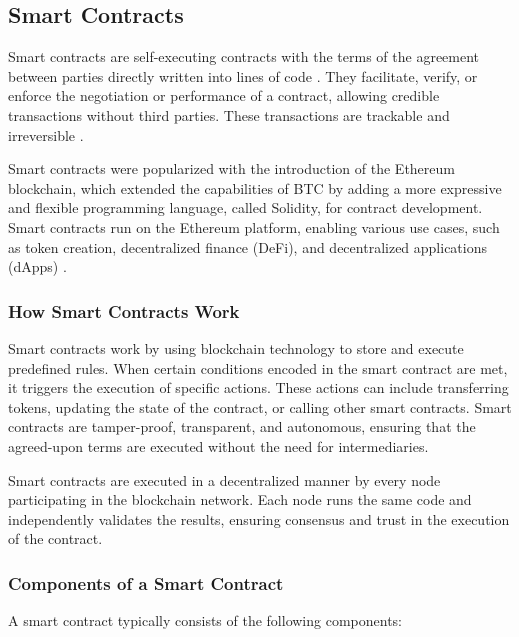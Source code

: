 \subsection{Smart Contracts}
Smart contracts are self-executing contracts with the terms of the agreement between parties directly written into lines of code \cite{szabo1997formalizing}. They facilitate, verify, or enforce the negotiation or performance of a contract, allowing credible transactions without third parties. These transactions are trackable and irreversible \cite{kosba2016hawk}.

Smart contracts were popularized with the introduction of the Ethereum blockchain, which extended the capabilities of \ac{BTC} by adding a more expressive and flexible programming language, called Solidity, for contract development. Smart contracts run on the Ethereum platform, enabling various use cases, such as token creation, decentralized finance (DeFi), and decentralized applications (dApps) \cite{mougayar2016business2}.

\subsubsection{How Smart Contracts Work}
Smart contracts work by using blockchain technology to store and execute predefined rules. When certain conditions encoded in the smart contract are met, it triggers the execution of specific actions. These actions can include transferring tokens, updating the state of the contract, or calling other smart contracts. Smart contracts are tamper-proof, transparent, and autonomous, ensuring that the agreed-upon terms are executed without the need for intermediaries.

Smart contracts are executed in a decentralized manner by every node participating in the blockchain network. Each node runs the same code and independently validates the results, ensuring consensus and trust in the execution of the contract.

\subsubsection{Components of a Smart Contract}
A smart contract typically consists of the following components:

